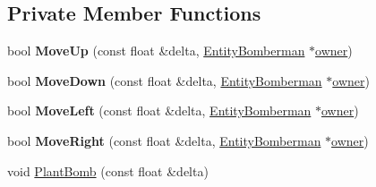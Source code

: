 \subsection*{Private Member Functions}
\begin{DoxyCompactItemize}
\item 
\mbox{\label{class_entity_bomberman_controller_af85cfb0ddafa3e936a8d579e6a0e1214}} 
bool {\bfseries Move\+Up} (const float \&delta, \mbox{\hyperlink{class_entity_bomberman}{Entity\+Bomberman}} $\ast$\mbox{\hyperlink{class_entity_controller_ae1cec9b9d4305b346d4a4dd0965dd136}{owner}})
\item 
\mbox{\label{class_entity_bomberman_controller_a0a6e729e728d617f81f2e073ca70eaf9}} 
bool {\bfseries Move\+Down} (const float \&delta, \mbox{\hyperlink{class_entity_bomberman}{Entity\+Bomberman}} $\ast$\mbox{\hyperlink{class_entity_controller_ae1cec9b9d4305b346d4a4dd0965dd136}{owner}})
\item 
\mbox{\label{class_entity_bomberman_controller_ac49acfcabbc7afe98d67e5b263564bac}} 
bool {\bfseries Move\+Left} (const float \&delta, \mbox{\hyperlink{class_entity_bomberman}{Entity\+Bomberman}} $\ast$\mbox{\hyperlink{class_entity_controller_ae1cec9b9d4305b346d4a4dd0965dd136}{owner}})
\item 
\mbox{\label{class_entity_bomberman_controller_a1bfa422c2a906b075a07b4a38b53ee1b}} 
bool {\bfseries Move\+Right} (const float \&delta, \mbox{\hyperlink{class_entity_bomberman}{Entity\+Bomberman}} $\ast$\mbox{\hyperlink{class_entity_controller_ae1cec9b9d4305b346d4a4dd0965dd136}{owner}})
\item 
void \mbox{\hyperlink{class_entity_bomberman_controller_a9298c48059d95138fef3af1426cbf11d}{Plant\+Bomb}} (const float \&delta)
\end{DoxyCompactItemize}
